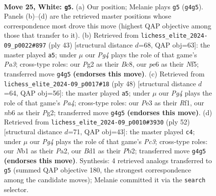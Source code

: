 \documentclass[11pt]{article}
\begin{document}
\clearpage

\begin{figure}[p]\centering
\begin{subfigure}{0.46\textwidth}\centering
\resizebox{\linewidth}{!}{%
\newchessgame
\chessboard[
  setfen={5r1k/4rppp/1nb1pn2/p1N5/6P1/1P2P3/P4RPP/RN1B2K1 w - - 3 25},
  showmover=false,
  pgfstyle=straightmove, color=movearrow, markmove={g4-g5}
]}
\caption{}
\end{subfigure}\hfill
\begin{subfigure}{0.46\textwidth}\centering
\resizebox{\linewidth}{!}{%
\newchessgame
\chessboard[
  setfen={2b2rk1/2r3pp/p3p3/1pNp1n2/1P6/3B1P2/P1PR2PP/2K4R b - - 0 22},
  showmover=false,
  pgfstyle=straightmove, color=movearrow, markmove={a6-a5}
]}
\caption{}
\end{subfigure}
\\[4pt]
\begin{subfigure}{0.46\textwidth}\centering
\resizebox{\linewidth}{!}{%
\newchessgame
\chessboard[
  setfen={6k1/pr3pb1/1pN4p/2nr4/P7/4PN2/1PR2PPP/5RK1 w - - 2 25},
  showmover=false,
  pgfstyle=straightmove, color=movearrow, markmove={a4-a5}
]}
\caption{}
\end{subfigure}\hfill
\begin{subfigure}{0.46\textwidth}\centering
\resizebox{\linewidth}{!}{%
\newchessgame
\chessboard[
  setfen={3r2k1/pr4pp/2pB1p2/R1Pnpb2/8/2P5/PPNR1PPP/5K2 w - - 12 27},
  showmover=false,
  pgfstyle=straightmove, color=movearrow, markmove={c3-c4}
]}
\caption{}
\end{subfigure}
\caption{\textbf{Move 25, White: \texttt{g5}.} (a) Our position; Melanie plays \texttt{g5} (\texttt{g4g5}). Panels (b)--(d) are the retrieved master positions whose correspondence most drove this move (highest QAP objective among those that transfer to it). (b) Retrieved from \texttt{lichess\_elite\_2024-09\_p0022\#897} (ply 43) [structural distance $d$=68, QAP obj=63]: the master played \texttt{a5}; under $\mu$ our \emph{Pg4} plays the role of that game's \emph{Pa3}; cross-type roles: our \emph{P}g2 as their \emph{B}c8, our \emph{p}e6 as their \emph{N}f5; transferred move \texttt{g4g5} \textbf{(endorses this move)}. (c) Retrieved from \texttt{lichess\_elite\_2024-09\_p0017\#18} (ply 48) [structural distance $d$=64, QAP obj=56]: the master played \texttt{a5}; under $\mu$ our \emph{Pg4} plays the role of that game's \emph{Pa4}; cross-type roles: our \emph{P}e3 as their \emph{R}f1, our \emph{n}b6 as their \emph{P}g2; transferred move \texttt{g4g5} \textbf{(endorses this move)}. (d) Retrieved from \texttt{lichess\_elite\_2024-09\_p0010\#3930} (ply 52) [structural distance $d$=71, QAP obj=43]: the master played \texttt{c4}; under $\mu$ our \emph{Pg4} plays the role of that game's \emph{Pc3}; cross-type roles: our \emph{N}b1 as their \emph{P}a2, our \emph{B}d1 as their \emph{P}b2; transferred move \texttt{g4g5} \textbf{(endorses this move)}. Synthesis: 4 retrieved analogs transferred to \texttt{g5} (summed QAP objective 180, the strongest correspondence among the candidate moves); Melanie committed it via the \texttt{search} selector.}
\label{fig:thought-m48}
\end{figure}
\end{document}
